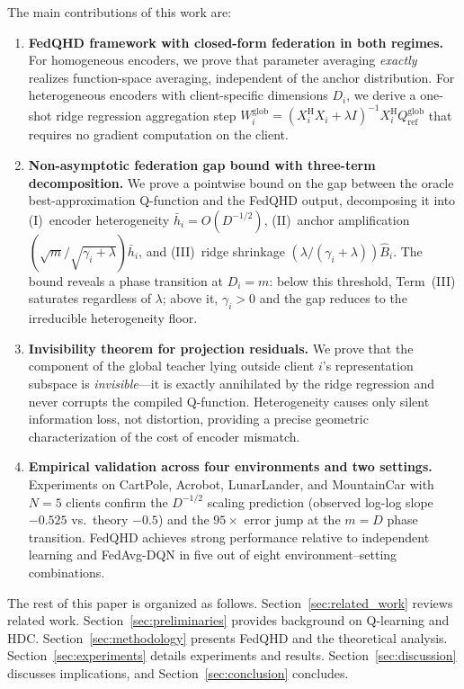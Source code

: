 The main contributions of this work are:
\begin{enumerate}
    \item \textbf{FedQHD framework with closed-form federation in both regimes.} For homogeneous encoders, we prove that parameter averaging \emph{exactly} realizes function-space averaging, independent of the anchor distribution. For heterogeneous encoders with client-specific dimensions $D_i$, we derive a one-shot ridge regression aggregation step
    $W^{\mathrm{glob}}_i = (X_i^{\mathrm{H}} X_i + \lambda I)^{-1} X_i^{\mathrm{H}} Q^{\mathrm{glob}}_{\mathrm{ref}}$
    that requires no gradient computation on the client.

    \item \textbf{Non-asymptotic federation gap bound with three-term decomposition.} We prove a pointwise bound on the gap between the oracle best-approximation Q-function and the FedQHD output, decomposing it into (I)~encoder heterogeneity $\bar{h}_i = O(D^{-1/2})$, (II)~anchor amplification $(\sqrt{m}/\sqrt{\gamma_i+\lambda})\bar{h}_i$, and (III)~ridge shrinkage $(\lambda/(\gamma_i+\lambda))\hat{B}_i$. The bound reveals a phase transition at $D_i = m$: below this threshold, Term~(III) saturates regardless of $\lambda$; above it, $\gamma_i > 0$ and the gap reduces to the irreducible heterogeneity floor.

    \item \textbf{Invisibility theorem for projection residuals.} We prove that the component of the global teacher lying outside client $i$'s representation subspace is \emph{invisible}—it is exactly annihilated by the ridge regression and never corrupts the compiled Q-function. Heterogeneity causes only silent information loss, not distortion, providing a precise geometric characterization of the cost of encoder mismatch.

    \item \textbf{Empirical validation across four environments and two settings.} Experiments on CartPole, Acrobot, LunarLander, and MountainCar with $N=5$ clients confirm the $D^{-1/2}$ scaling prediction (observed log-log slope $-0.525$ vs.\ theory $-0.5$) and the $95\times$ error jump at the $m=D$ phase transition. FedQHD achieves strong performance relative to independent learning and FedAvg-DQN in five out of eight environment--setting combinations.
\end{enumerate}

The rest of this paper is organized as follows. Section~\ref{sec:related_work} reviews related work. Section~\ref{sec:preliminaries} provides background on Q-learning and HDC. Section~\ref{sec:methodology} presents FedQHD and the theoretical analysis. Section~\ref{sec:experiments} details experiments and results. Section~\ref{sec:discussion} discusses implications, and Section~\ref{sec:conclusion} concludes.
